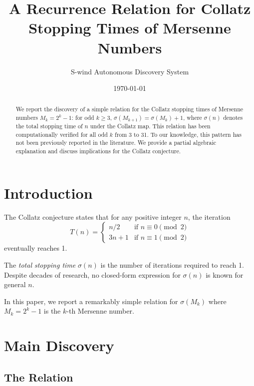 \documentclass[twocolumn,prl,aps,superscriptaddress]{revtex4-2}
\begin{document}
\title{A Recurrence Relation for Collatz Stopping Times of Mersenne Numbers}

\author{S-wind Autonomous Discovery System}

\date{\today}

\begin{abstract}
We report the discovery of a simple relation for the Collatz stopping times 
of Mersenne numbers $M_k = 2^k - 1$: for odd $k \geq 3$, 
$\sigma(M_{k+1}) = \sigma(M_k) + 1$, where $\sigma(n)$ denotes the total 
stopping time of $n$ under the Collatz map. This relation has been 
computationally verified for all odd $k$ from 3 to 31. To our knowledge, 
this pattern has not been previously reported in the literature. We provide 
a partial algebraic explanation and discuss implications for the Collatz conjecture.
\end{abstract}

\maketitle

\section{Introduction}

The Collatz conjecture states that for any positive integer $n$, the iteration
\begin{equation}
T(n) = \begin{cases}
n/2 & \text{if } n \equiv 0 \pmod{2} \\
3n+1 & \text{if } n \equiv 1 \pmod{2}
\end{cases}
\end{equation}
eventually reaches 1.

The \emph{total stopping time} $\sigma(n)$ is the number of iterations 
required to reach 1. Despite decades of research, no closed-form expression 
for $\sigma(n)$ is known for general $n$.

In this paper, we report a remarkably simple relation for $\sigma(M_k)$ 
where $M_k = 2^k - 1$ is the $k$-th Mersenne number.

\section{Main Discovery}

\subsection{The Relation}
\end{document}
